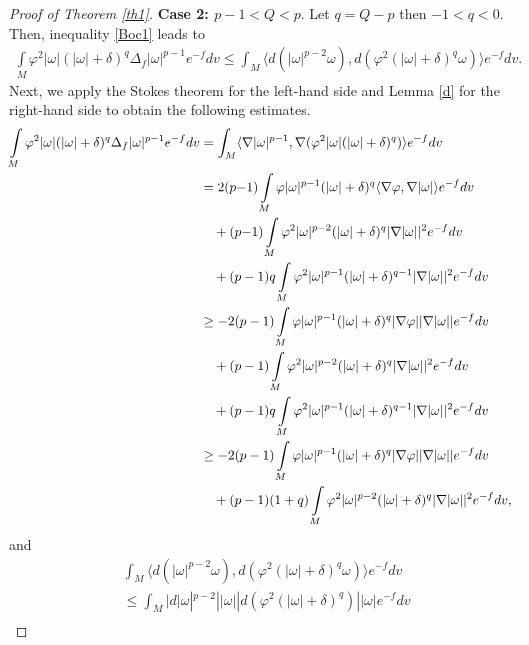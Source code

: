 \documentclass[leqno,12pt]{article} %
\theoremstyle{plain} %
\theoremstyle{definition} %
\numberwithin{equation}{section}
\begin{document}
\begin{proof}[Proof of Theorem \ref{th1}]
	\textbf{Case 2: $p-1<Q<p$}. Let $q=Q-p$ then $-1<q<0$. Then, inequality \eqref{Boc1} leads to
	\begin{align}\label{c12}
		\int\limits_M \varphi ^2|\omega |(|\omega|+\delta)^q \Delta_f |\omega |^{p-1} e^{-f} dv \le 
		\int_M \langle d(|\omega|^{p-2}\omega),d(\varphi^2 (|\omega|+\delta)^q\omega) \rangle  e^{-f}dv.
	\end{align}
	Next, we apply the Stokes theorem for the left-hand side and Lemma \ref{d} for the right-hand side to obtain the following estimates.
	\begin{align}\label{del2}\nonumber
		\int\limits_M {{\varphi ^2}|\omega |(|\omega|+\delta)^q\Delta_f |\omega |^{p-1}}e^{-f}dv \nonumber
			&=\int_M \langle \nabla |\omega|^{p-1}, \nabla ( \varphi^2 |\omega|(|\omega|+\delta)^q) \rangle e^{-f}dv\\ \nonumber
		&=   2(p{-}1)\int\limits_M {\varphi |\omega |^{p-1} (|\omega|+\delta)^q  \langle \nabla \varphi ,\nabla |\omega | \rangle }e^{-f}dv\\
         &\quad + (p{-}1) \int\limits_M {{\varphi ^2}|\omega|^{p-2} (|\omega|+\delta)^q |\nabla |\omega |{|^2}}e^{-f}dv  \nonumber\\ \nonumber
		&
		\quad+(p-1) q\int\limits_M {{\varphi ^2}|\omega|^{p-1} (|\omega|+\delta)^{q-1} |\nabla |\omega |{|^2}}e^{-f}dv\\\nonumber
		&\ge  -2(p-1)\int\limits_M {\varphi |\omega |^{p-1} (|\omega|+\delta)^q  | \nabla \varphi| |\nabla |\omega | | }e^{-f} dv \\ &\nonumber \quad  +
		(p-1) \int\limits_M {{\varphi ^2}|\omega|^{p-2} (|\omega|+\delta)^q |\nabla |\omega |{|^2}}e^{-f}dv\\ \nonumber
		& \quad
		+(p-1) q\int\limits_M {{\varphi ^2}|\omega|^{p-1} (|\omega|+\delta)^{q-1} |\nabla |\omega |{|^2}}e^{-f}dv\\ 
		&\ge  -2(p-1)\int\limits_M {\varphi |\omega |^{p-1} (|\omega|+\delta)^q  | \nabla \varphi| |\nabla |\omega | | }e^{-f} dv \notag \\ &\quad + 
		(p-1)(1+q) \int\limits_M {{\varphi ^2}|\omega|^{p-2} (|\omega|+\delta)^q |\nabla |\omega |{|^2}}e^{-f}dv,
	\end{align}
	and
	\begin{align}\label{d2}\nonumber
		&\int_M \langle d(|\omega|^{p-2}\omega),d(\varphi^2 (|\omega|+\delta)^q\omega) \rangle e^{-f}dv \\\nonumber
		&\le \int_M |d|\omega|^{p-2}||\omega||d(\varphi^2 (|\omega|+\delta)^q)||\omega|e^{-f}dv\\\nonumber

\end{align}
\end{proof}
\end{document}
